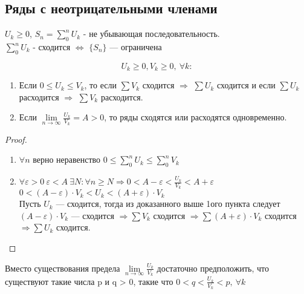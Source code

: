 \subsection{Ряды с неотрицательными членами}
$U_k \geq 0$, $S_n = \sum\limits_{0}^{n} U_k$ - не убывающая последовательность. \\
$\sum\limits_{0}^{n} U_k$ - сходится $\Leftrightarrow$ $\{S_n\} $ --- ограничена
\begin{comment}
  Сходимость ряда эквивалентна ограниченности $S_n$
\end{comment}

\begin{theorem}
    $$U_k \geq 0, V_k \geq 0, \ \forall k:$$
    \begin{enumerate}
      \item
        Если $0 \leq U_k \leq V_k$, то если $\sum V_k$ сходится $\Rightarrow$
        $\sum U_k$ сходится и если
        $\sum U_k$ расходится $\Rightarrow$ $\sum V_k$ расходится.
      \item
        Если $\lim\limits_{n\to \infty} \frac{U_k}{V_k} = A > 0$, то ряды
        сходятся или расходятся одновременно.
    \end{enumerate}
\end{theorem}

\pagebreak
\begin{proof}
  \hfill
  \begin{enumerate}
    \item
      $\forall n$ верно неравенство $0 \leq \sum\limits_{0}^{n} U_k \leq
      \sum\limits_{0}^{n} V_k$
    \item
      $\forall \varepsilon > 0 \ \varepsilon < A \ \exists N : \forall n \geq N
      \Rightarrow 0 < A - \varepsilon < \frac{U_k}{V_k} < A + \varepsilon$ \\
      $0 < (A - \varepsilon) \cdot V_k < U_k < (A + \varepsilon) \cdot V_k$ \\
      Пусть $U_k$ --- сходится, тогда из доказанного выше 1ого пункта следует
      $(A - \varepsilon) \cdot V_k$ --- сходится
      $\Rightarrow \sum V_k$ сходится
      $\Rightarrow \sum (A + \varepsilon) \cdot V_k$ сходится
      $\Rightarrow \sum U_k$ сходится.
  \end{enumerate}
\end{proof}

\begin{remark}
  Вместо существования предела $\lim\limits_{n \to \infty} \frac{U_k}{V_k}$
  достаточно предположить, что существуют такие числа
  p и q > 0, такие что $0 < q < \frac{U_k}{V_k} < p, \ \forall k$
\end{remark}

